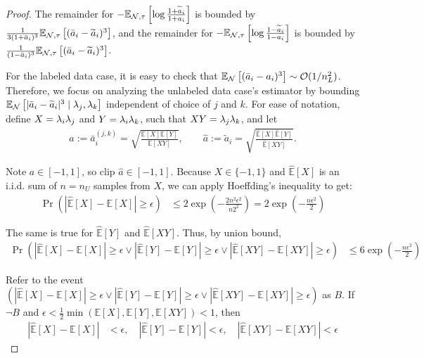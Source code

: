 \begin{proof}
The remainder for $-\mathbb{E}_{\mathcal{N}, \tau}\left[\log \frac{1 + \widetilde{a}_i}{1 + a_i}\right]$ is bounded by $\frac{1}{3(1 + \bar{a}_i)^3}\mathbb{E}_{\mathcal{N}, \tau}\left[(\bar{a}_i - \widetilde{a}_i)^3\right]$, and the remainder for $-\mathbb{E}_{\mathcal{N}, \tau}\left[\log \frac{1 - \widetilde{a}_i}{1 - a_i}\right]$ is bounded by $\frac{1}{(1 - \bar{a}_i)^3} \mathbb{E}_{\mathcal{N}, \tau}\left[(\bar{a}_i - \widetilde{a}_i)^3\right]$.

For the labeled data case, it is easy to check that $\mathbb{E}_{\mathcal{N}}\left[(\bar{a}_i - a_i)^3\right] \sim \mathcal{O}(1/n_L^2)$. Therefore, we focus on analyzing the unlabeled data case's estimator by bounding $\mathbb{E}_{\mathcal{N}}\left[|\bar{a}_i - \widetilde{a}_i|^3 \; | \; \lambda_j, \lambda_k\right]$ independent of choice of $j$ and $k$. For ease of notation, define $X =\lambda_i \lambda_j$ and $Y = \lambda_i \lambda_k$, such that $XY = \lambda_j \lambda_k$, and let 
\begin{align}
    a := \bar{a}_i^{(j, k)} = \sqrt{  \frac{\mathbb{E}[X] \mathbb{E}[Y]}{\mathbb{E}[XY]}   }, \qquad \hat{a} := \widetilde{a}_i = \sqrt{  \frac{\hat{\mathbb{E}}[X] \hat{\mathbb{E}}[Y]}{\hat{\mathbb{E}}[XY]}   }.
\end{align}

Note $a \in [-1,1]$, so clip $\hat{a} \in [-1,1]$. Because $X \in \{-1,1\}$ and $\hat{\mathbb{E}}[X]$ is an i.i.d. sum of $n = n_U$ samples from $X$, we can apply Hoeffding's inequality to get:
\begin{align}
    \Pr \left( |\hat{\mathbb{E}}[X] - \mathbb{E}[X]| \geq \epsilon \right) &\leq 2 \exp \left( - \frac{2 n^2 \epsilon^2}{n 2^2}   \right) = 2 \exp \left( - \frac{n \epsilon^2}{2} \right)
\end{align}

The same is true for $\hat{\mathbb{E}}[Y]$ and $\hat{\mathbb{E}}[XY]$. Thus, by union bound,
\begin{align}
    \Pr \left( |\hat{\mathbb{E}}[X] - \mathbb{E}[X]| \geq \epsilon \vee |\hat{\mathbb{E}}[Y] - \mathbb{E}[Y]| \geq \epsilon \vee |\hat{\mathbb{E}}[XY] - \mathbb{E}[XY]| \geq \epsilon \right) &\leq 6 \exp \left( - \frac{n \epsilon^2}{2} \right)
\end{align}

Refer to the event $\left( |\hat{\mathbb{E}}[X] - \mathbb{E}[X]| \geq \epsilon \vee |\hat{\mathbb{E}}[Y] - \mathbb{E}[Y]| \geq \epsilon \vee |\hat{\mathbb{E}}[XY] - \mathbb{E}[XY]| \geq \epsilon \right)$ as $B$. If $\neg B$ and $\epsilon< \frac{1}{2} \min(\mathbb{E}[X], \mathbb{E}[Y], \mathbb{E}[XY]) < 1$, then
\begin{align}
    |\hat{\mathbb{E}}[X] - \mathbb{E}[X]| &< \epsilon, \quad|\hat{\mathbb{E}}[Y] - \mathbb{E}[Y]| < \epsilon, \quad |\hat{\mathbb{E}}[XY] - \mathbb{E}[XY]| < \epsilon
\end{align}


\end{proof}
